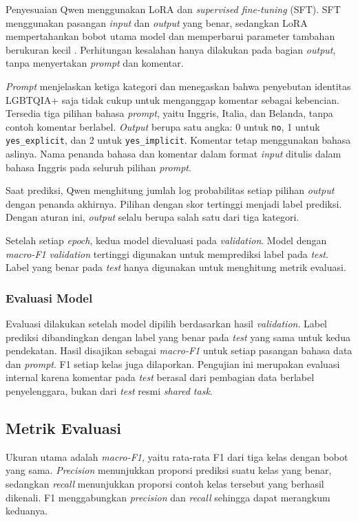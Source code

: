 \documentclass[11pt]{article}
\begin{document}
Penyesuaian Qwen menggunakan LoRA dan \textit{supervised fine-tuning} (SFT). SFT menggunakan pasangan \textit{input} dan \textit{output} yang benar, sedangkan LoRA mempertahankan bobot utama model dan memperbarui parameter tambahan berukuran kecil \citep{hu-etal-2021-lora}. Perhitungan kesalahan hanya dilakukan pada bagian \textit{output}, tanpa menyertakan \textit{prompt} dan komentar.

\textit{Prompt} menjelaskan ketiga kategori dan menegaskan bahwa penyebutan identitas LGBTQIA+ saja tidak cukup untuk menganggap komentar sebagai kebencian. Tersedia tiga pilihan bahasa \textit{prompt}, yaitu Inggris, Italia, dan Belanda, tanpa contoh komentar berlabel. \textit{Output} berupa satu angka: 0 untuk \texttt{no}, 1 untuk \texttt{yes\_explicit}, dan 2 untuk \texttt{yes\_implicit}. Komentar tetap menggunakan bahasa aslinya. Nama penanda bahasa dan komentar dalam format \textit{input} ditulis dalam bahasa Inggris pada seluruh pilihan \textit{prompt}.

Saat prediksi, Qwen menghitung jumlah log probabilitas setiap pilihan \textit{output} dengan penanda akhirnya. Pilihan dengan skor tertinggi menjadi label prediksi. Dengan aturan ini, \textit{output} selalu berupa salah satu dari tiga kategori.

Setelah setiap \textit{epoch}, kedua model dievaluasi pada \textit{validation}. Model dengan \textit{macro-F1} \textit{validation} tertinggi digunakan untuk memprediksi label pada \textit{test}. Label yang benar pada \textit{test} hanya digunakan untuk menghitung metrik evaluasi.

\subsubsection{Evaluasi Model}
Evaluasi dilakukan setelah model dipilih berdasarkan hasil \textit{validation}. Label prediksi dibandingkan dengan label yang benar pada \textit{test} yang sama untuk kedua pendekatan. Hasil disajikan sebagai \textit{macro-F1} untuk setiap pasangan bahasa data dan \textit{prompt}. F1 setiap kelas juga dilaporkan. Pengujian ini merupakan evaluasi internal karena komentar pada \textit{test} berasal dari pembagian data berlabel penyelenggara, bukan dari \textit{test} resmi \textit{shared task}.

\subsection{Metrik Evaluasi}
Ukuran utama adalah \textit{macro-F1}, yaitu rata-rata F1 dari tiga kelas dengan bobot yang sama. \textit{Precision} menunjukkan proporsi prediksi suatu kelas yang benar, sedangkan \textit{recall} menunjukkan proporsi contoh kelas tersebut yang berhasil dikenali. F1 menggabungkan \textit{precision} dan \textit{recall} sehingga dapat merangkum keduanya.
\end{document}
